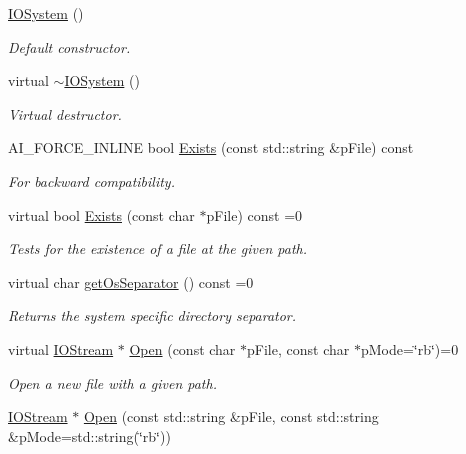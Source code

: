 \begin{DoxyCompactItemize}
\item 
\hyperlink{class_assimp_1_1_i_o_system_af8ba1ee2dc0686da8fc9e3dad49af801}{I\+O\+System} ()
\begin{DoxyCompactList}\small\item\em Default constructor. \end{DoxyCompactList}\item 
virtual \hyperlink{class_assimp_1_1_i_o_system_a617417f1c5125770606fea3b41068b36}{$\sim$\+I\+O\+System} ()
\begin{DoxyCompactList}\small\item\em Virtual destructor. \end{DoxyCompactList}\item 
A\+I\+\_\+\+F\+O\+R\+C\+E\+\_\+\+I\+N\+L\+I\+N\+E bool \hyperlink{class_assimp_1_1_i_o_system_a7ae6cfaea4957408967463bfc3b84b27}{Exists} (const std\+::string \&p\+File) const 
\begin{DoxyCompactList}\small\item\em For backward compatibility. \end{DoxyCompactList}\item 
virtual bool \hyperlink{class_assimp_1_1_i_o_system_a79f5fe8d2dbe1056c9418f7de9a72445}{Exists} (const char $\ast$p\+File) const =0
\begin{DoxyCompactList}\small\item\em Tests for the existence of a file at the given path. \end{DoxyCompactList}\item 
virtual char \hyperlink{class_assimp_1_1_i_o_system_a40e412875b985bdb638f00ef0f20fff6}{get\+Os\+Separator} () const =0
\begin{DoxyCompactList}\small\item\em Returns the system specific directory separator. \end{DoxyCompactList}\item 
virtual \hyperlink{class_assimp_1_1_i_o_stream}{I\+O\+Stream} $\ast$ \hyperlink{class_assimp_1_1_i_o_system_ac512ece3b0701de5682553007a4c0816}{Open} (const char $\ast$p\+File, const char $\ast$p\+Mode=\char`\"{}rb\char`\"{})=0
\begin{DoxyCompactList}\small\item\em Open a new file with a given path. \end{DoxyCompactList}\item 
\hyperlink{class_assimp_1_1_i_o_stream}{I\+O\+Stream} $\ast$ \hyperlink{class_assimp_1_1_i_o_system_aef35fabc9bd49fb83bfd4f12a94083c3}{Open} (const std\+::string \&p\+File, const std\+::string \&p\+Mode=std\+::string(\char`\"{}rb\char`\"{}))

\end{DoxyCompactItemize}
